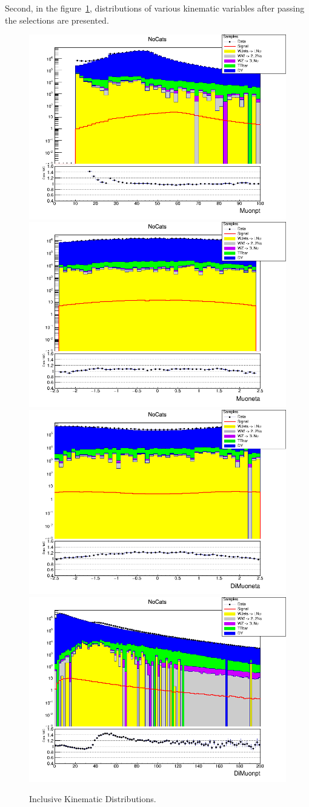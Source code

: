 Second, in the figure~\ref{fig:higgs_selections_inclusivekinematic}, distributions of various kinematic variables after passing the selections are presented.
\begin{figure}[!h]
  \centering
  \includegraphics[width=0.45\linewidth]{figures/ch_higgs/distributions/baseline_kalman/distribution__NoCats__Muonpt__logY.png}
  \includegraphics[width=0.45\linewidth]{figures/ch_higgs/distributions/baseline_kalman/distribution__NoCats__Muoneta__logY.png}\\
  \includegraphics[width=0.45\linewidth]{figures/ch_higgs/distributions/baseline_kalman/distribution__NoCats__DiMuoneta__logY.png}
  \includegraphics[width=0.45\linewidth]{figures/ch_higgs/distributions/baseline_kalman/distribution__NoCats__DiMuonpt__logY.png}
  \caption{Inclusive Kinematic Distributions.}
  \label{fig:higgs_selections_inclusivekinematic}
\end{figure}

